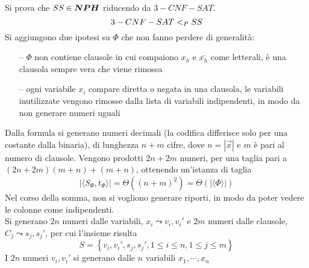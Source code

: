 Si prova che $SS \in \bm{NPH}$ riducendo da $3-CNF-SAT$.
\begin{equation*}
    3-CNF-SAT <_P SS
\end{equation*}
Si aggiungono due ipotesi su $\Phi$ che non fanno perdere di generalità:
\begin{itemize}[noitemsep,parsep=0pt,partopsep=0pt,topsep=0pt]
    \item[--] $\Phi$ non contiene clausole in cui compaiono $x_h$ e $\bar{x_h}$ come letterali, è una clausola sempre vera che viene rimossa
    \item[--] ogni variabile $x_i$ compare diretta o negata in una clausola, le variabili inutilizzate vengono rimosse dalla lista di variabili indipendenti, in modo da non generare numeri uguali
\end{itemize}
Dalla formula si generano numeri decimali (la codifica differisce solo per una costante dalla binaria), di lunghezza $n+m$ cifre, dove $n = | \vec{x} |$ e $m$ è pari al numero di clausole. Vengono prodotti $2n+2m$ numeri, per una taglia pari a $(2n+2m)(m+n)+(m+n)$, ottenendo un'istanza di taglia
\begin{equation*}
    | \langle S_{\Phi}, t_{\Phi} \rangle | = \Theta \left( \left( n+m \right)^2 \right) =
    \Theta \left( | \langle \Phi \rangle | \right)
\end{equation*}
Nel corso della somma, non si vogliono generare riporti, in modo da poter vedere le colonne come indipendenti.
\\
Si generano $2n$ numeri dalle variabili, $x_i \leadsto v_i, v_i'$
e $2m$ numeri dalle clausole, $C_j \leadsto s_j, s_j'$, per cui l'insieme risulta
\begin{equation*}
    S = \left\{ v_i, v_i', s_j, s_j', 1 \le i \le n, 1 \le j \le m \right\}
\end{equation*}
I $2n$ numeri $v_i, v_i'$ si generano dalle $n$ variabili $x_1, \cdots, x_n$
